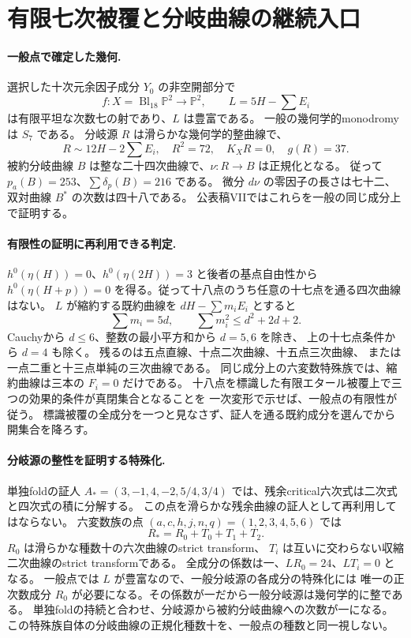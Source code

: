 \section{有限七次被覆と分岐曲線の継続入口}
\label{sec:notes-septic-new-v30}

\paragraph{一般点で確定した幾何.}
選択した十次元余因子成分 $Y_0$ の非空開部分で
\[
 f:X=\operatorname{Bl}_{18}\mathbb P^2\longrightarrow\mathbb P^2,
 \qquad L=5H-\sum E_i
\]
は有限平坦な次数七の射であり、$L$ は豊富である。
一般の幾何学的monodromyは $S_7$ である。
分岐源 $R$ は滑らかな幾何学的整曲線で、
\[
 R\sim12H-2\sum E_i,\quad R^2=72,\quad K_XR=0,\quad g(R)=37.
\]
被約分岐曲線 $B$ は整な二十四次曲線で、$\nu:R\to B$ は正規化となる。
従って $p_a(B)=253$、$\sum\delta_p(B)=216$ である。
微分 $d\nu$ の零因子の長さは七十二、双対曲線 $B^*$ の次数は四十八である。
公表稿VIIではこれらを一般の同じ成分上で証明する\cite{PaperVII}。

\paragraph{有限性の証明に再利用できる判定.}
$h^0(\eta(H))=0$、$h^0(\eta(2H))=3$ と後者の基点自由性から
$h^0(\eta(H+p))=0$ を得る。従って十八点のうち任意の十七点を通る四次曲線はない。
$L$ が縮約する既約曲線を $dH-\sum m_iE_i$ とすると
\[
 \sum m_i=5d,\qquad \sum m_i^2\le d^2+2d+2.
\]
Cauchyから $d\le6$、整数の最小平方和から $d=5,6$ を除き、
上の十七点条件から $d=4$ も除く。
残るのは五点直線、十点二次曲線、十五点三次曲線、
または一点二重と十三点単純の三次曲線である。
同じ成分上の六変数特殊族では、縮約曲線は三本の $F_i=0$ だけである。
十八点を標識した有限エタール被覆上で三つの効果的条件が真閉集合となることを
一次変形で示せば、一般点の有限性が従う。
標識被覆の全成分を一つと見なさず、証人を通る既約成分を選んでから開集合を降ろす。

\paragraph{分岐源の整性を証明する特殊化.}
単独foldの証人 $A_*=(3,-1,4,-2,5/4,3/4)$ では、残余critical六次式は二次式と四次式の積に分解する。
この点を滑らかな残余曲線の証人として再利用してはならない。
六変数族の点 $(a,c,h,j,n,q)=(1,2,3,4,5,6)$ では
\[
 R_*=R_0+T_0+T_1+T_2.
\]
$R_0$ は滑らかな種数十の六次曲線のstrict transform、
$T_i$ は互いに交わらない収縮二次曲線のstrict transformである。
全成分の係数は一、$LR_0=24$、$LT_i=0$ となる。
一般点では $L$ が豊富なので、一般分岐源の各成分の特殊化には
唯一の正次数成分 $R_0$ が必要になる。その係数が一だから一般分岐源は幾何学的に整である。
単独foldの持続と合わせ、分岐源から被約分岐曲線への次数が一になる。
この特殊族自体の分岐曲線の正規化種数十を、一般点の種数と同一視しない。

